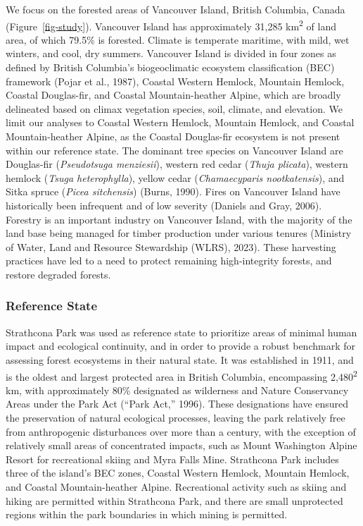 \documentclass[
]{agujournal2019}
\begin{document}
We focus on the forested areas of Vancouver Island, British Columbia,
Canada (Figure~\ref{fig-study}). Vancouver Island has approximately
31,285 km\textsuperscript{2} of land area, of which 79.5\% is forested.
Climate is temperate maritime, with mild, wet winters, and cool, dry
summers. Vancouver Island is divided in four zones as defined by British
Columbia's biogeoclimatic ecosystem classification (BEC) framework
(Pojar et al., 1987), Coastal Western Hemlock, Mountain Hemlock, Coastal
Douglas-fir, and Coastal Mountain-heather Alpine, which are broadly
delineated based on climax vegetation species, soil, climate, and
elevation. We limit our analyses to Coastal Western Hemlock, Mountain
Hemlock, and Coastal Mountain-heather Alpine, as the Coastal Douglas-fir
ecosystem is not present within our reference state. The dominant tree
species on Vancouver Island are Douglas-fir (\emph{Pseudotsuga
menziesii}), western red cedar (\emph{Thuja plicata}), western hemlock
(\emph{Tsuga heterophylla}), yellow cedar (\emph{Chamaecyparis
nootkatensis}), and Sitka spruce (\emph{Picea sitchensis}) (Burns,
1990). Fires on Vancouver Island have historically been infrequent and
of low severity (Daniels and Gray, 2006). Forestry is an important
industry on Vancouver Island, with the majority of the land base being
managed for timber production under various tenures (Ministry of Water,
Land and Resource Stewardship (WLRS), 2023). These harvesting practices
have led to a need to protect remaining high-integrity forests, and
restore degraded forests.

\subsubsection{Reference State}\label{reference-state}

Strathcona Park was used as reference state to prioritize areas of
minimal human impact and ecological continuity, and in order to provide
a robust benchmark for assessing forest ecosystems in their natural
state. It was established in 1911, and is the oldest and largest
protected area in British Columbia, encompassing
2,480\textsuperscript{2} km, with approximately 80\% designated as
wilderness and Nature Conservancy Areas under the Park Act ({``Park
{Act},''} 1996). These designations have ensured the preservation of
natural ecological processes, leaving the park relatively free from
anthropogenic disturbances over more than a century, with the exception
of relatively small areas of concentrated impacts, such as Mount
Washington Alpine Resort for recreational skiing and Myra Falls Mine.
Strathcona Park includes three of the island's BEC zones, Coastal
Western Hemlock, Mountain Hemlock, and Coastal Mountain-heather Alpine.
Recreational activity such as skiing and hiking are permitted within
Strathcona Park, and there are small unprotected regions within the park
boundaries in which mining is permitted.
\end{document}
